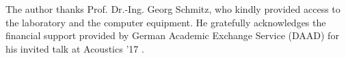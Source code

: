 The author thanks
Prof. Dr.-Ing. Georg Schmitz, who kindly provided
access to
the laboratory and
the computer equipment.
He gratefully acknowledges
the financial support provided by
German Academic Exchange Service (DAAD) for
his invited talk at
Acoustics '17
\cite{article:SchiffnerJASA2017}.
